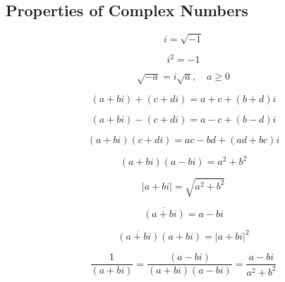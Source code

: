 \documentclass[12pt, a5paper]{article}
\begin{document}
\subsection*{Properties of Complex Numbers}
$$
i = \sqrt{-1}
$$

$$
i^2 = -1
$$

$$
\sqrt{-a} = i\sqrt{a},\quad a \ge 0
$$

$$
(a + bi) + (c + di) = a + c + (b + d)i
$$

$$
(a + bi) - (c + di) = a - c + (b - d)i
$$

$$
(a + bi)(c + di) = ac - bd + (ad + bc)i
$$

$$
(a + bi)(a - bi) = a^2 + b^2
$$

$$
\vert a + bi \vert = \sqrt{a^2 + b^2}
$$

$$
\overline{(a + bi)} = a - bi
$$

$$
\overline{(a + bi)}(a + bi) = \vert a + bi\vert^2
$$

$$
\dfrac{1}{(a + bi)} = \dfrac{(a - bi)}{(a + bi)(a - bi)} = \dfrac{a - bi}{a^2 + b^2}
$$
\end{document}
